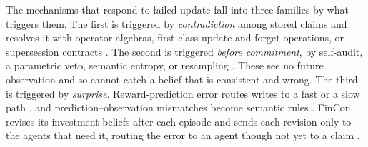 The mechanisms that respond to failed update fall into three families by what triggers them. The first is triggered by \emph{contradiction} among stored claims and resolves it with operator algebras, first-class update and forget operations, or supersession contracts \citep{wang2026toki,hao2026memops,xu2026governed,qin2026mom}. The second is triggered \emph{before commitment}, by self-audit, a parametric veto, semantic entropy, or resampling \citep{yuan2026verify,song2026agent,yan2026denoiseflow,wang2026t2po}. These see no future observation and so cannot catch a belief that is consistent and wrong. The third is triggered by \emph{surprise}. Reward-prediction error routes writes to a fast or a slow path \citep{song2026d}, and prediction--observation mismatches become semantic rules \citep{zhang2026selfevolvingx}. FinCon revises its investment beliefs after each episode and sends each revision only to the agents that need it, routing the error to an agent though not yet to a claim \citep{yu2024fincon}.
